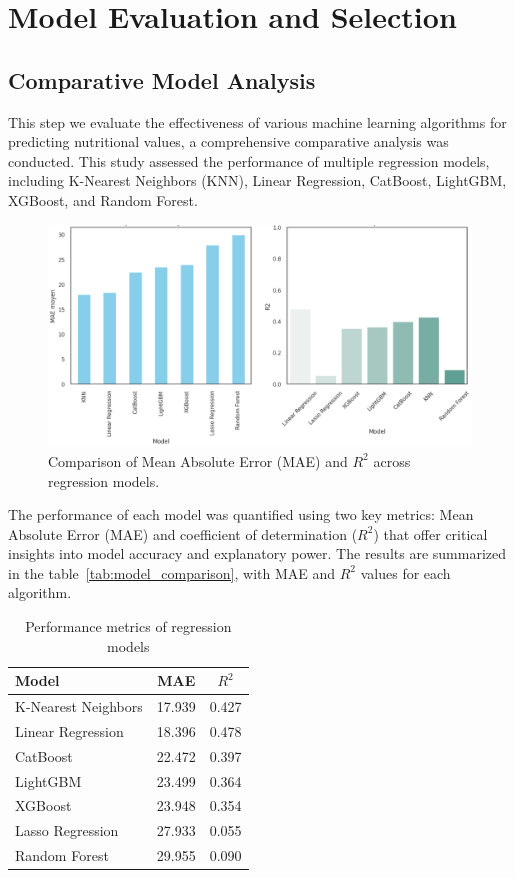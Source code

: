 \section{Model Evaluation and Selection}

\subsection{Comparative Model Analysis}
\par This step we evaluate the effectiveness of various machine learning algorithms for predicting nutritional values, a comprehensive comparative analysis was conducted. This study assessed the performance of multiple regression models, including K-Nearest Neighbors (KNN), Linear Regression, CatBoost, LightGBM, XGBoost, and Random Forest.
\begin{figure}[H]
    \centering
    \includegraphics[width=1.15\linewidth]{images/mae_r2_comparison.png}
    \caption{Comparison of Mean Absolute Error (MAE) and \(R^2\) across regression models.}
    \label{fig:model_comparison}
\end{figure}

The performance of each model was quantified using two key metrics: Mean Absolute Error (MAE) and coefficient of determination ($R^2$) that offer critical insights into model accuracy and explanatory power. The results are summarized in the table~\ref{tab:model_comparison}, with MAE and \(R^2\) values for each algorithm.

\begin{table}[H]
    \centering
    \caption{Performance metrics of regression models}
    \begin{tabular}{lcc}
        \toprule
        \textbf{Model} & \textbf{MAE} & \textbf{\(R^2\)} \\
        \midrule
        K-Nearest Neighbors & 17.939 & 0.427 \\
        Linear Regression & 18.396 & 0.478 \\
        CatBoost & 22.472 & 0.397 \\
        LightGBM & 23.499 & 0.364 \\
        XGBoost & 23.948 & 0.354 \\
        Lasso Regression &  27.933 & 0.055 \\
        Random Forest & 29.955 & 0.090 \\
        \bottomrule
    \end{tabular}
\end{table}

